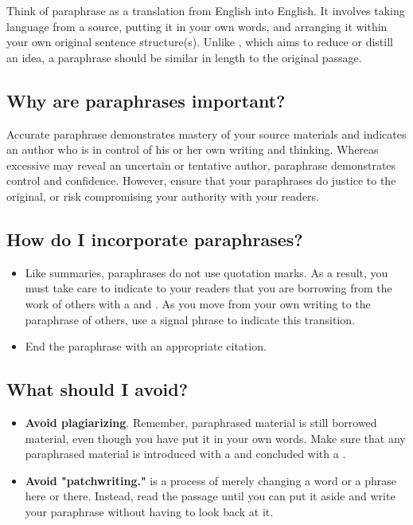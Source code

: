 Think of paraphrase as a translation from English into English. It involves
taking
language from a source, putting it in your own words, and arranging it within
your own original
sentence structure(s). Unlike \hyperlink{summary}{\color{Ahrenge}{summary}}, which aims to reduce or distill an
idea, a paraphrase should
be similar in length to the original passage.

\subsection{Why are paraphrases important?}

Accurate paraphrase demonstrates mastery of your source materials and
indicates an author who is in control of his or her own writing and thinking. Whereas excessive
\hyperlink{quotation}{\color{Ahrenge}{quotation}} may reveal an uncertain or tentative author, paraphrase demonstrates control and
confidence. However, ensure that your paraphrases do justice to the original, or risk compromising
your authority with your readers.

\subsection{How do I incorporate paraphrases?}

\begin{itemize}
\item Like summaries, paraphrases do not use quotation marks. As a result,
you must take care to indicate to your readers that you are borrowing from
the work of others with a \hyperlink{signalphrase}{\color{Ahrenge}{signal phrase}} and \hyperlink{citation}{\color{Ahrenge}{citation}}. As you move
from your own writing to the paraphrase of others, use a signal phrase to
indicate this transition.

\item End the paraphrase with an appropriate citation.

\end{itemize}

\subsection {What should I avoid?}

\begin{itemize}

\item \textbf{Avoid plagiarizing}. Remember, paraphrased material
is still borrowed material, even though you have put it in your own words. Make sure that any paraphrased material is introduced with a \hyperlink{signalphrase}{\color{Ahrenge}{signal phrase}} and concluded with a \hyperlink{citation}{\color{Ahrenge}{citation}}.

\item \textbf{Avoid "patchwriting."} \hyperlink{patchwriting}{\color{Ahrenge}{Patchwriting}} is a process of merely changing a word or a phrase here or there. Instead, read the passage until you can put it aside and write your paraphrase without having to look back at it.
\end{itemize}

